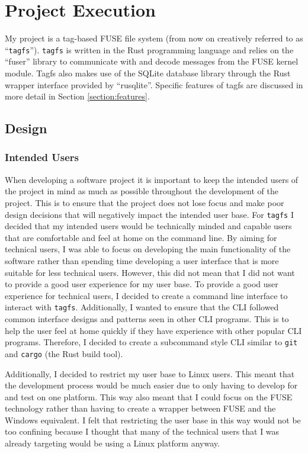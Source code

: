 \chapter{Project Execution}
\vspace{1cm}

My project is a tag-based FUSE file system (from now on creatively referred to
as ``\texttt{tagfs}''). \texttt{tagfs} is written in the Rust programming
language and relies on the ``fuser'' library to communicate with and decode
messages from the FUSE kernel module. Tagfs also makes use of the SQLite
database library through the Rust wrapper interface provided by ``rusqlite''.
Specific features of tagfs are discussed in more detail in Section
\ref{section:features}.

\section{Design}
\label{sec:design}

\subsection{Intended Users}

When developing a software project it is important to keep the intended users
of the project in mind as much as possible throughout the development of the
project. This is to ensure that the project does not lose focus and make poor
design decisions that will negatively impact the intended user base. For
\texttt{tagfs} I decided that my intended users would be technically
minded and capable users that are comfortable and feel at home on the command
line. By aiming for technical users, I was able to focus on developing the
main functionality of the software rather than spending time developing a user
interface that is more suitable for less technical users. However, this did not
mean that I did not want to provide a good user experience for my user base. To
provide a good user experience for technical users, I decided to create a
command line interface to interact with \texttt{tagfs}. Additionally, I wanted
to ensure that the CLI followed common interface designs and patterns seen in
other CLI programs. This is to help the user feel at home quickly if they have
experience with other popular CLI programs. Therefore, I decided to create a
subcommand style CLI similar to \texttt{git} and \texttt{cargo} (the Rust build
tool).

Additionally, I decided to restrict my user base to Linux users. This meant
that the development process would be much easier due to only having to develop
for and test on one platform. This way also meant that I could focus on the
FUSE technology rather than having to create a wrapper between FUSE and the
Windows equivalent. I felt that restricting the user base in this way would not
be too confining because I thought that many of the technical users that I was
already targeting would be using a Linux platform anyway.

